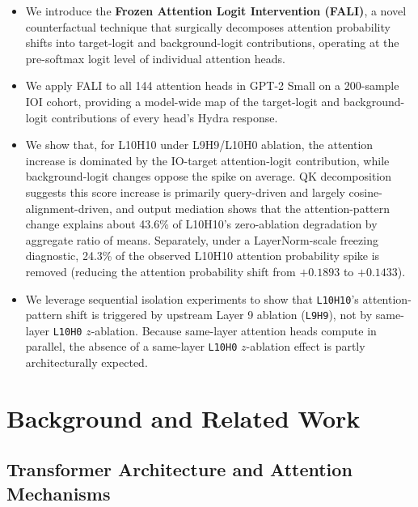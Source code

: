 \documentclass[10pt]{article} %
\begin{document}
\begin{itemize}
  \item We introduce the \textbf{Frozen Attention Logit Intervention (FALI)}, a
    novel counterfactual technique that surgically decomposes attention probability shifts into
    target-logit and background-logit contributions, operating at the pre-softmax
    logit level of individual attention heads.
  \item We apply FALI to all 144 attention heads in GPT-2 Small on a
    200-sample IOI cohort, providing a model-wide map of the target-logit and background-logit
    contributions of every head's Hydra response.
  \item We show that, for L10H10 under L9H9/L10H0 ablation, the attention increase is dominated by the IO-target attention-logit contribution, while background-logit changes oppose the spike on average. QK decomposition suggests this score increase is primarily query-driven and largely cosine-alignment-driven, and output mediation shows that the attention-pattern change explains about 43.6\% of L10H10's zero-ablation degradation by aggregate ratio of means. Separately, under a LayerNorm-scale freezing diagnostic, 24.3\% of the observed L10H10 attention probability spike is removed (reducing the attention probability shift from $+0.1893$ to $+0.1433$).
  \item We leverage sequential isolation experiments to show that \texttt{L10H10}'s attention-pattern shift is triggered by upstream Layer 9 ablation (\texttt{L9H9}), not by same-layer \texttt{L10H0} $z$-ablation. Because same-layer attention heads compute in parallel, the absence of a same-layer \texttt{L10H0} $z$-ablation effect is partly architecturally expected.
\end{itemize}

\section{Background and Related Work}
\label{sec:background}

\subsection{Transformer Architecture and Attention Mechanisms}
\end{document}

